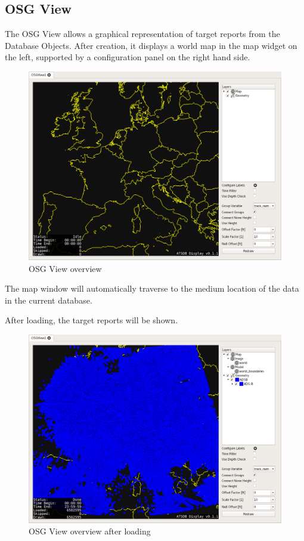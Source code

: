 \subsection{OSG View}
\label{sec:osgview}

The OSG View allows a graphical representation of target reports from the Database Objects. After creation, it displays a world map in the map widget on the left, supported by a configuration panel on the right hand side.

\begin{figure}[H]
    \hspace*{-2cm}
    \includegraphics[width=18cm,frame]{../screenshots/osgview_overview.png}
  \caption{OSG View overview}
  \label{fig:osgview_overview}
\end{figure}

The map window will automatically traverse to the medium location of the data in the current database.

After loading, the target reports will be shown.

\begin{figure}[H]
    \hspace*{-2cm}
    \includegraphics[width=18cm,frame]{../screenshots/osgview_overview_loaded.png}
  \caption{OSG View overview after loading}
\end{figure}


